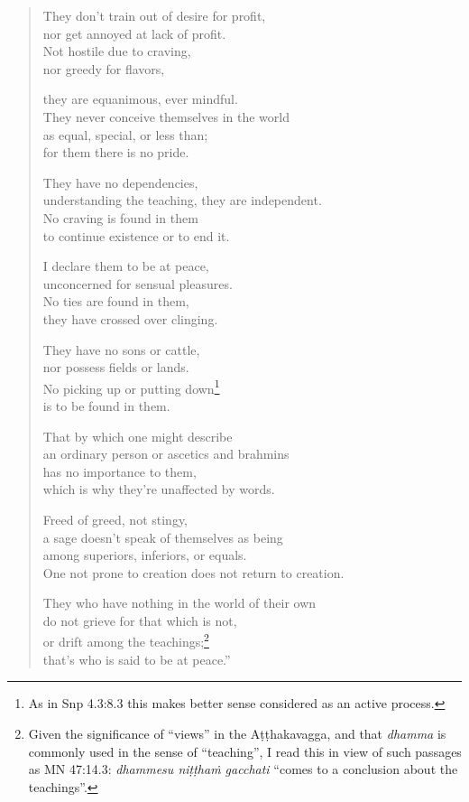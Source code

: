 \documentclass[12pt,openany]{book}%
\begin{document}
\begin{verse}
They don’t train out of desire for profit, \\
nor get annoyed at lack of profit. \\
Not hostile due to craving, \\
nor greedy for flavors, 

they are equanimous, ever mindful. \\
They never conceive themselves in the world \\
as equal, special, or less than; \\
for them there is no pride. 

They have no dependencies, \\
understanding the teaching, they are independent. \\
No craving is found in them \\
to continue existence or to end it. 

I declare them to be at peace, \\
unconcerned for sensual pleasures. \\
No ties are found in them, \\
they have crossed over clinging. 

They have no sons or cattle, \\
nor possess fields or lands. \\
No picking up or putting down\footnote{As in Snp 4.3:8.3 this makes better sense considered as an active process. } \\
is to be found in them. 

That by which one might describe \\
an ordinary person or ascetics and brahmins \\
has no importance to them, \\
which is why they’re unaffected by words. 

Freed of greed, not stingy, \\
a sage doesn’t speak of themselves as being \\
among superiors, inferiors, or equals. \\
One not prone to creation does not return to creation. 

They who have nothing in the world of their own \\
do not grieve for that which is not, \\
or drift among the teachings;\footnote{Given the significance of “views” in the \textsanskrit{Aṭṭhakavagga}, and that \textit{dhamma} is commonly used in the sense of “teaching”, I read this in view of such passages as MN 47:14.3: \textit{dhammesu \textsanskrit{niṭṭhaṁ} gacchati} “comes to a conclusion about the teachings”. } \\
that’s who is said to be at peace.” 

%
\end{verse}
\end{document}
